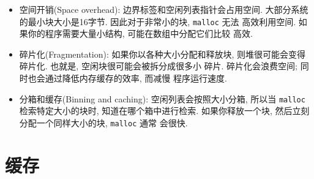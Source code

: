 \documentclass[12pt]{book}
\begin{document}
{\begin{itemize}
\item 空间开销(Space overhead): 边界标签和空闲列表指针会占用空间. 
大部分系统的最小块大小是16字节. 因此对于非常小的块, {\tt malloc} 无法
高效利用空间. 如果你的程序需要大量小结构, 可能在数组中分配它们比较
高效. 
 
\item 碎片化(Fragmentation): 如果你以各种大小分配和释放块, 
  则堆很可能会变得碎片化. 也就是, 空闲块很可能会被拆分成很多小
  碎片. 碎片化会浪费空间; 同时也会通过降低内存缓存的效率, 而减慢
  程序运行速度.


\item 分箱和缓存(Binning and caching): 空闲列表会按照大小分箱, 
  所以当 {\tt malloc} 检索特定大小的块时, 知道在哪个箱中进行检索. 
  如果你释放一个块, 然后立刻分配一个同样大小的块, {\tt malloc} 通常
  会很快.

\end{itemize}


\chapter{缓存}


}
\end{document}
